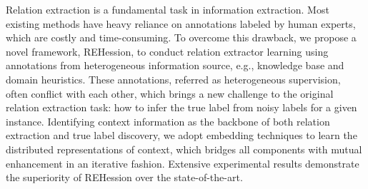 Relation extraction is a fundamental task in information extraction. Most existing methods have heavy reliance on annotations labeled by human experts, which are costly and time-consuming. To overcome this drawback, we propose a novel framework, REHession, to conduct relation extractor learning using annotations from heterogeneous information source, e.g., knowledge base and domain heuristics. These annotations, referred as heterogeneous supervision, often conflict with each other, which brings a new challenge to the original relation extraction task: how to infer the true label from noisy labels for a given instance. Identifying context information as the backbone of both relation extraction and true label discovery, we adopt embedding techniques to learn the distributed representations of context, which bridges all components with mutual enhancement in an iterative fashion. Extensive experimental results demonstrate the superiority of REHession over the state-of-the-art.
